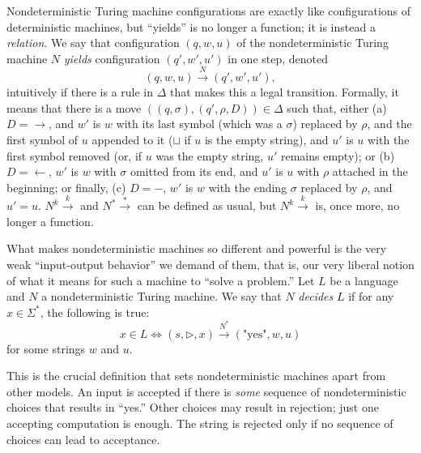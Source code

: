 \documentclass[12pt]{article}
\newcommand{\tr}{\triangleright}
\begin{document}
Nondeterministic Turing machine configurations are exactly like configurations of deterministic machines, but ``yields'' is no longer a function; it is instead a \textit{relation}. We say that configuration $(q, w, u)$ of the nondeterministic Turing machine $N$ \textit{yields} configuration $(q', w', u')$ in one step, denoted
\[
(q, w, u) \stackrel{N}{\rightarrow} (q', w', u'),
\]
intuitively if there is a rule in $\Delta$ that makes this a legal transition. Formally, it means that there is a move $((q, \sigma), (q', \rho, D)) \in \Delta$ such that, either (a) $D = \rightarrow$, and $w'$ is $w$ with its last symbol (which was a $\sigma$) replaced by $\rho$, and the first symbol of $u$ appended to it ($\sqcup$ if $u$ is the empty string), and $u'$ is $u$ with the first symbol removed (or, if $u$ was the empty string, $u'$ remains empty); or (b) $D = \leftarrow$, $w'$ is $w$ with $\sigma$ omitted from its end, and $u'$ is $u$ with $\rho$ attached in the beginning; or finally, (c) $D = -$, $w'$ is $w$ with the ending $\sigma$ replaced by $\rho$, and $u' = u$. $N^k \stackrel{k}{\rightarrow}$ and $N^* \stackrel{*}{\rightarrow}$ can be defined as usual, but $N^k \stackrel{k}{\rightarrow}$ is, once more, no longer a function.

What makes nondeterministic machines so different and powerful is the very weak ``input-output behavior'' we demand of them, that is, our very liberal notion of what it means for such a machine to ``solve a problem.'' Let $L$ be a language and $N$ a nondeterministic Turing machine. We say that $N$ \textit{decides} $L$ if for any $x \in \Sigma^*$, the following is true:
\[
x\in L \iff (s, \tr, x) \stackrel{N^*}{\rightarrow} (\text{"yes"}, w, u)
\]
for some strings $w$ and $u$.

This is the crucial definition that sets nondeterministic machines apart from other models. An input is accepted if there is \textit{some} sequence of nondeterministic choices that results in ``yes.'' Other choices may result in rejection; just one accepting computation is enough. The string is rejected only if no sequence of choices can lead to acceptance.
\end{document}
